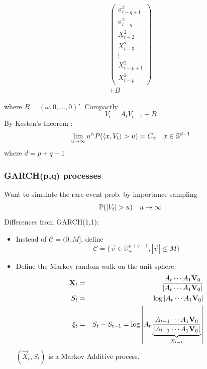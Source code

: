 \documentclass{beamer}
\begin{document}
\begin{frame}
\begin{tiny}
\begin{eqnarray*}
\begin{pmatrix}
        \sigma_{t-q+1}^2 \\
        \sigma_{t-q}^2 \\
        X_{t-2}^2 \\
        X_{t-3}^2 \\
        \vdots \\
        X_{t-p+1}^2 \\
        X_{t-p}^2
      \end{pmatrix} \\
      + B
    \end{eqnarray*}
  \end{tiny}
  \begin{small}
    where $B = (\omega, 0, \dots, 0)'$. Compactly
    \[
    V_t = A_t V_{t-1} + B
    \]
    By Kesten's theorem \cite{kesten:1973}:
    \[
    \lim_{u \to \infty} u^{\alpha} P(\inn{x, V_t} > u) = C_\alpha \quad x \in \mathbb S^{d-1}
    \]
    where $d = p + q -1$
  \end{small}
\end{frame}

\begin{frame}
  \frametitle{GARCH(p,q) processes}
  \begin{scriptsize}
    Want to simulate the rare event prob. by importance sampling
    \[
    \P(|V_t| > u) \quad u \to \infty  
    \]
    Differences from GARCH(1,1):
    \begin{itemize}
    \item Instead of $\mathcal C = (0, M]$, define
      \[
      \mathcal C = \{\vec v \in \mathbb R_+^{p+q-1}, |\vec v| \leq M\}
      \]
    \item Define the Markov random walk on the unit sphere:
      \begin{eqnarray*}
        \vec X_t &=& A_{t} \cdots A_1 \vec V_0 \over |A_{t} \cdots A_1 \vec V_0| \\
        S_t &=& \log |A_t \cdots A_1 \vec V_0| \\
        \xi_t &=& S_t - S_{t-1} =
        \log \left|A_t
          \underbrace{
            {A_{t-1} \cdots A_1 \vec V_0 \over |A_{t-1} \cdots A_1 \vec V_0|}
          }_{X_{t-1}}
        \right|
      \end{eqnarray*}
      $(\vec X_t, S_t)$ is a Markov Additive process.
    \end{itemize}
  \end{scriptsize}
\end{frame}
\end{document}
